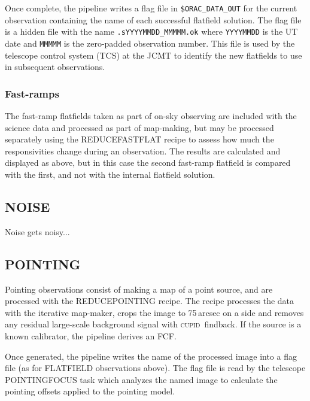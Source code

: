 \documentclass[twoside,11pt]{article}
\renewcommand{\_}{\texttt{\symbol{95}}}
\newcommand{\CUPID}{\textsc{cupid}}
\newcommand{\task}[1]{\textsf{#1}}
\begin{document}
\begin{figure}
\centering
\caption{\label{fig:flatfield}}
\end{figure}

Once complete, the pipeline writes a flag file in
\verb+$ORAC_DATA_OUT+ for the current observation containing the name
of each successful flatfield solution. The flag file is a hidden file
with the name \verb+.sYYYYMMDD_MMMMM.ok+ where \verb+YYYYMMDD+ is the
UT date and \verb+MMMMM+ is the zero-padded observation number. This
file is used by the telescope control system (TCS) at the JCMT to
identify the new flatfields to use in subsequent observations.

\subsubsection{Fast-ramps}

The fast-ramp flatfields taken as part of on-sky observing are
included with the science data and processed as part of map-making,
but may be processed separately using the \task{REDUCE\_FASTFLAT}
recipe to assess how much the responsivities change during an
observation. The results are calculated and displayed as above, but in
this case the second fast-ramp flatfield is compared with the first,
and not with the internal flatfield solution.

\subsection{NOISE}

Noise gets noisy...

\subsection{POINTING}

Pointing observations consist of making a map of a point source, and
are processed with the \task{REDUCE\_POINTING} recipe. The recipe
processes the data with the iterative map-maker, crops the image to
75\,arcsec on a side and removes any residual large-scale background
signal with \CUPID\ \task{findback}. If the source is a known
calibrator, the pipeline derives an FCF.

Once generated, the pipeline writes the name of the processed image
into a flag file (as for FLATFIELD observations above). The flag file
is read by the telescope POINTING\_FOCUS task which analyzes the named
image to calculate the pointing offsets applied to the pointing model.
\end{document}
